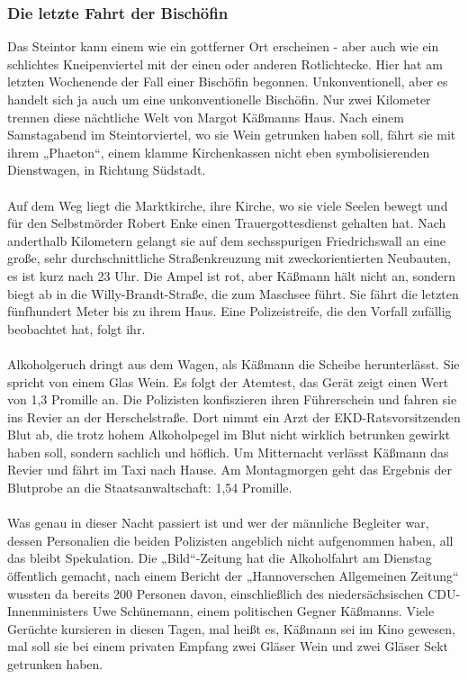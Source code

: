 \documentclass[a4paper,12pt,twoside]{scrbook}
\begin{document}
\subsubsection{Die letzte Fahrt der Bischöfin}
Das Steintor kann einem wie ein gottferner Ort erscheinen - aber auch wie ein schlichtes Kneipenviertel mit der einen oder anderen Rotlichtecke. Hier hat am letzten Wochenende der Fall einer Bischöfin begonnen. Unkonventionell, aber es handelt sich ja auch um eine unkonventionelle Bischöfin. Nur zwei Kilometer trennen diese nächtliche Welt von Margot Käßmanns Haus. Nach einem Samstagabend im Steintorviertel, wo sie Wein getrunken haben soll, fährt sie mit ihrem „Phaeton“, einem klamme Kirchenkassen nicht eben symbolisierenden Dienstwagen, in Richtung Südstadt.
\\\\
Auf dem Weg liegt die Marktkirche, ihre Kirche, wo sie viele Seelen bewegt und für den Selbstmörder Robert Enke einen Trauergottesdienst gehalten hat. Nach anderthalb Kilometern gelangt sie auf dem sechsspurigen Friedrichswall an eine große, sehr durchschnittliche Straßenkreuzung mit zweckorientierten Neubauten, es ist kurz nach 23 Uhr. Die Ampel ist rot, aber Käßmann hält nicht an, sondern biegt ab in die Willy-Brandt-Straße, die zum Maschsee führt. Sie fährt die letzten fünfhundert Meter bis zu ihrem Haus. Eine Polizeistreife, die den Vorfall zufällig beobachtet hat, folgt ihr.
\\\\
Alkoholgeruch dringt aus dem Wagen, als Käßmann die Scheibe herunterlässt. Sie spricht von einem Glas Wein. Es folgt der Atemtest, das Gerät zeigt einen Wert von 1,3 Promille an. Die Polizisten konfiszieren ihren Führerschein und fahren sie ins Revier an der Herschelstraße. Dort nimmt ein Arzt der EKD-Ratsvorsitzenden Blut ab, die trotz hohem Alkoholpegel im Blut nicht wirklich betrunken gewirkt haben soll, sondern sachlich und höflich. Um Mitternacht verlässt Käßmann das Revier und fährt im Taxi nach Hause. Am Montagmorgen geht das Ergebnis der Blutprobe an die Staatsanwaltschaft: 1,54 Promille.
\\\\
Was genau in dieser Nacht passiert ist und wer der männliche Begleiter war, dessen Personalien die beiden Polizisten angeblich nicht aufgenommen haben, all das bleibt Spekulation. Die „Bild“-Zeitung hat die Alkoholfahrt am Dienstag öffentlich gemacht, nach einem Bericht der „Hannoverschen Allgemeinen Zeitung“ wussten da bereits 200 Personen davon, einschließlich des niedersächsischen CDU-Innenministers Uwe Schünemann, einem politischen Gegner Käßmanns. Viele Gerüchte kursieren in diesen Tagen, mal heißt es, Käßmann sei im Kino gewesen, mal soll sie bei einem privaten Empfang zwei Gläser Wein und zwei Gläser Sekt getrunken haben.
\end{document}
